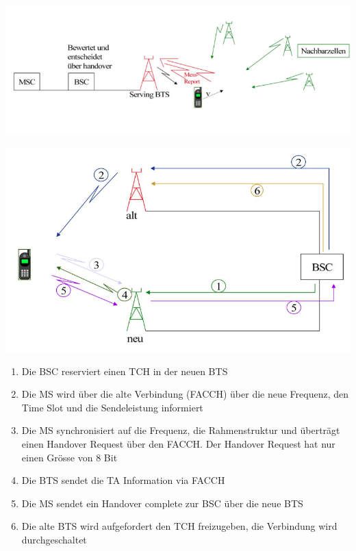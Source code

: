 \begin{minipage}{0.5 \linewidth}
\includegraphics[width = \linewidth]{./Pics/GSMHandover3}
\end{minipage}

\begin{minipage}{0.5 \linewidth}
\includegraphics[width = \linewidth]{./Pics/GSMIntraHO}
\end{minipage}
\begin{minipage}{0.5 \linewidth}
\begin{enumerate}
\item Die BSC reserviert einen TCH in der neuen BTS
\item Die MS wird über die alte Verbindung (FACCH) über die neue Frequenz, den Time Slot und die Sendeleistung informiert
\item Die MS synchronisiert auf die Frequenz, die Rahmenstruktur und überträgt einen Handover Request über den FACCH. Der Handover Request hat nur einen Grösse von 8 Bit
\item Die BTS sendet die TA Information via FACCH
\item Die MS sendet ein Handover complete zur BSC über die neue BTS
\item Die alte BTS wird aufgefordert den TCH freizugeben, die Verbindung wird durchgeschaltet
\end{enumerate}
\end{minipage}


